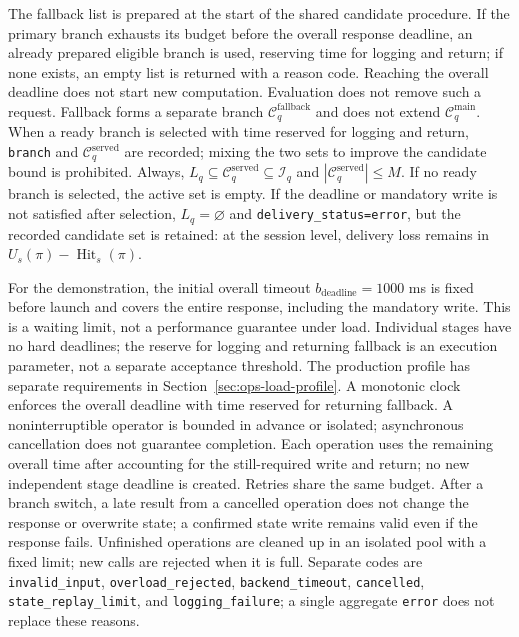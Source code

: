 \documentclass[12pt,a4paper]{article}
\newcommand{\code}[1]{{\ttfamily\small\nolinkurl{#1}}}
\theoremstyle{plainru}
\begin{document}
The fallback list is prepared at the start of the shared candidate procedure.
If the primary branch exhausts its budget before the overall response deadline,
an already prepared eligible branch is used, reserving time
for logging and return; if none exists, an empty list is returned
with a reason code. Reaching the overall deadline does not start new computation.
Evaluation does not remove such a request. Fallback forms a separate branch
$\mathcal C_q^{\mathrm{fallback}}$ and does not extend
$\mathcal C_q^{\mathrm{main}}$. When a ready branch is selected with time reserved
for logging and return, \code{branch} and
$\mathcal C_q^{\mathrm{served}}$ are recorded; mixing the two sets
to improve the candidate bound is prohibited. Always,
$L_q\subseteq\mathcal C_q^{\mathrm{served}}\subseteq\mathcal I_q$
and $|\mathcal C_q^{\mathrm{served}}|\le M$. If no ready branch
is selected, the active set is empty. If the deadline or mandatory write
is not satisfied after selection, $L_q=\varnothing$ and
\code{delivery_status=error}, but the recorded candidate set
is retained: at the session level, delivery loss remains in
$U_s(\pi)-\operatorname{Hit}_s(\pi)$.

For the demonstration, the initial overall timeout
$b_{\mathrm{deadline}}=1000$ ms is fixed before launch and covers
the entire response, including the mandatory write. This is a waiting limit,
not a performance guarantee under load. Individual stages have no hard
deadlines; the reserve for logging and returning fallback is an execution parameter,
not a separate acceptance threshold. The production profile has separate
requirements in Section~\ref{sec:ops-load-profile}.
A monotonic clock enforces the overall deadline with time reserved for returning fallback.
A noninterruptible operator is bounded
in advance or isolated; asynchronous cancellation does not guarantee completion.
Each operation uses the remaining overall time after accounting for the still-required
write and return; no new independent stage deadline is created.
Retries share the same budget. After a branch switch,
a late result from a cancelled operation does not change the response or overwrite
state; a confirmed state write remains valid even
if the response fails. Unfinished operations are cleaned up in an isolated
pool with a fixed limit; new calls are rejected when it
is full. Separate codes are \code{invalid_input},
\code{overload_rejected}, \code{backend_timeout}, \code{cancelled},
\code{state_replay_limit}, and \code{logging_failure}; a single aggregate
\code{error} does not replace these reasons.
\end{document}
